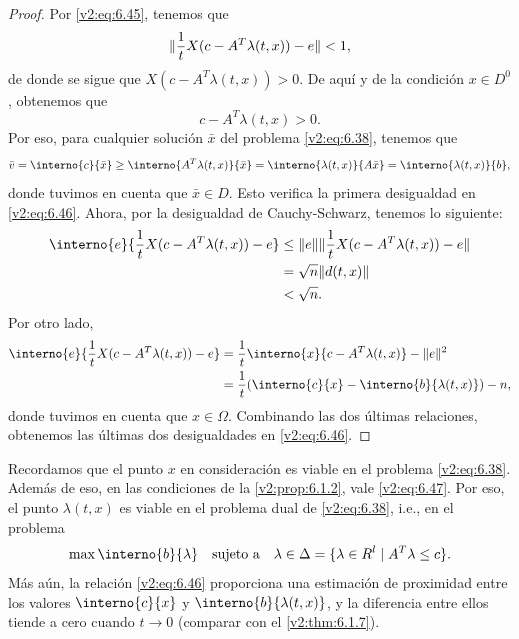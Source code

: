 \begin{proof}
    Por \eqref{v2:eq:6.45}, tenemos que
    \[
        \lVert\frac{1}{t} X(c - A^T \lambda(t, x)) - e\rVert < 1,
    \]
    de donde se sigue que $X(c - A^T \lambda(t, x)) > 0$. De aquí y de la condición $x \in D^0$, obtenemos que
    \begin{equation}
        c - A^T \lambda(t, x) > 0.
        \label{v2:eq:6.47}
    \end{equation}
    Por eso, para cualquier solución $\bar{x}$ del problema \eqref{v2:eq:6.38}, tenemos que
    \[
        \bar{v} = \interno{c}{\bar{x}} \ge \interno{A^T \lambda(t, x)}{\bar{x}} = \interno{\lambda(t, x)}{A\bar{x}} = \interno{\lambda(t, x)}{b},
    \]
    donde tuvimos en cuenta que $\bar{x} \in D$. Esto verifica la primera desigualdad en \eqref{v2:eq:6.46}. Ahora, por la desigualdad de Cauchy-Schwarz, tenemos lo siguiente:
    \begin{align*}
        \interno{e}{\frac{1}{t} X(c - A^T \lambda(t, x)) - e} &\le \norm{e} \norm{\frac{1}{t} X(c - A^T \lambda(t, x)) - e} \\
        &= \sqrt{n} \norm{d(t, x)} \\
        &< \sqrt{n}.
    \end{align*}
    Por otro lado,
    \begin{align*}
        \interno{e}{\frac{1}{t} X(c - A^T \lambda(t, x)) - e} &= \frac{1}{t} \interno{x}{c - A^T \lambda(t, x)} - \norm{e}^2 \\
        &= \frac{1}{t} (\interno{c}{x} - \interno{b}{\lambda(t, x)}) - n,
    \end{align*}
    donde tuvimos en cuenta que $x \in \Omega$. Combinando las dos últimas relaciones, obtenemos las últimas dos desigualdades en \eqref{v2:eq:6.46}.
\end{proof}

Recordamos que el punto $x$ en consideración es viable en el problema \eqref{v2:eq:6.38}. Además de eso, en las condiciones de la \cref{v2:prop:6.1.2}, vale \eqref{v2:eq:6.47}. Por eso, el punto $\lambda(t, x)$ es viable en el problema dual de \eqref{v2:eq:6.38}, i.e., en el problema
\begin{equation}
    \max \interno{b}{\lambda} \quad \text{sujeto a} \quad \lambda \in \Delta = \{ \lambda \in \R^l \mid A^T \lambda \le c \}.
    \label{v2:eq:6.48}
\end{equation}
Más aún, la relación \eqref{v2:eq:6.46} proporciona una estimación de proximidad entre los valores $\interno{c}{x}$ y $\interno{b}{\lambda(t, x)}$, y la diferencia entre ellos tiende a cero cuando $t \to 0$ (comparar con el \cref{v2:thm:6.1.7}).

